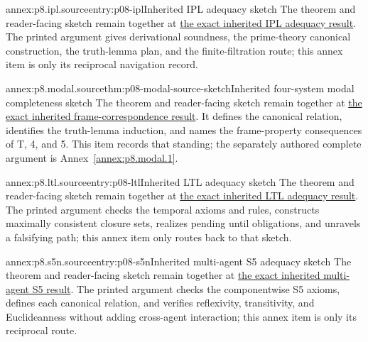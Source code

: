 
\begin{annexitem}{annex:p8.ipl.source}{entry:p08-ipl}{Inherited IPL adequacy sketch}
The theorem and reader-facing sketch remain together at
\hyperref[thm:p08-source-ipl-adequacy]{the exact inherited IPL adequacy
result}.  The printed argument gives derivational soundness, the prime-theory
canonical construction, the truth-lemma plan, and the finite-filtration route;
this annex item is only its reciprocal navigation record.
\end{annexitem}

\begin{annexitem}{annex:p8.modal.source}{thm:p08-modal-source-sketch}{Inherited four-system modal completeness sketch}
The theorem and reader-facing sketch remain together at
\hyperref[thm:p08-source-modal-four-adequacy]{the exact inherited
frame-correspondence result}.  It defines the canonical relation, identifies
the truth-lemma induction, and names the frame-property consequences of T, 4,
and 5.  This item records that standing; the separately authored complete
argument is Annex~\ref{annex:p8.modal.1}.
\end{annexitem}

\begin{annexitem}{annex:p8.ltl.source}{entry:p08-ltl}{Inherited LTL adequacy sketch}
The theorem and reader-facing sketch remain together at
\hyperref[thm:p08-source-ltl-adequacy]{the exact inherited LTL adequacy
result}.  The printed argument checks the temporal axioms and rules, constructs
maximally consistent closure sets, realizes pending until obligations, and
unravels a falsifying path; this annex item only routes back to that sketch.
\end{annexitem}

\begin{annexitem}{annex:p8.s5n.source}{entry:p08-s5n}{Inherited multi-agent S5 adequacy sketch}
The theorem and reader-facing sketch remain together at
\hyperref[thm:p08-source-s5n-adequacy]{the exact inherited multi-agent S5
result}.  The printed argument checks the componentwise S5 axioms, defines
each canonical relation, and verifies reflexivity, transitivity, and
Euclideanness without adding cross-agent interaction; this annex item is only
its reciprocal route.
\end{annexitem}

